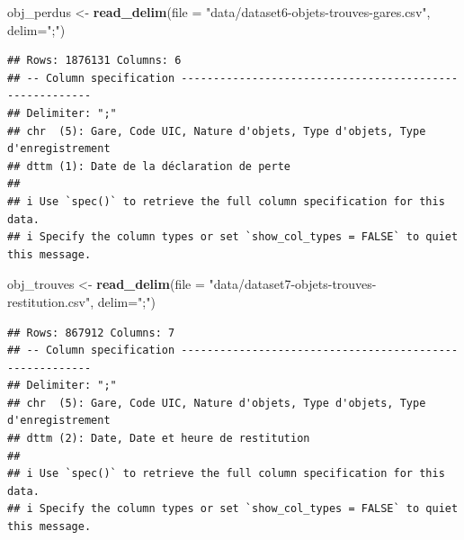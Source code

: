 \documentclass[
]{article}
\newenvironment{Shaded}{\begin{snugshade}}{\end{snugshade}}
\newcommand{\AttributeTok}[1]{\textcolor[rgb]{0.13,0.29,0.53}{#1}}
\newcommand{\FunctionTok}[1]{\textcolor[rgb]{0.13,0.29,0.53}{\textbf{#1}}}
\newcommand{\NormalTok}[1]{#1}
\newcommand{\OtherTok}[1]{\textcolor[rgb]{0.56,0.35,0.01}{#1}}
\newcommand{\StringTok}[1]{\textcolor[rgb]{0.31,0.60,0.02}{#1}}
\begin{document}
\begin{Shaded}
\begin{Highlighting}[]
\NormalTok{obj\_perdus }\OtherTok{\textless{}{-}} \FunctionTok{read\_delim}\NormalTok{(}\AttributeTok{file =} \StringTok{"data/dataset6{-}objets{-}trouves{-}gares.csv"}\NormalTok{, }\AttributeTok{delim=}\StringTok{";"}\NormalTok{)}
\end{Highlighting}
\end{Shaded}

\begin{verbatim}
## Rows: 1876131 Columns: 6
## -- Column specification --------------------------------------------------------
## Delimiter: ";"
## chr  (5): Gare, Code UIC, Nature d'objets, Type d'objets, Type d'enregistrement
## dttm (1): Date de la déclaration de perte
## 
## i Use `spec()` to retrieve the full column specification for this data.
## i Specify the column types or set `show_col_types = FALSE` to quiet this message.
\end{verbatim}

\begin{Shaded}
\begin{Highlighting}[]
\NormalTok{obj\_trouves }\OtherTok{\textless{}{-}} \FunctionTok{read\_delim}\NormalTok{(}\AttributeTok{file =} \StringTok{"data/dataset7{-}objets{-}trouves{-}restitution.csv"}\NormalTok{, }\AttributeTok{delim=}\StringTok{";"}\NormalTok{)}
\end{Highlighting}
\end{Shaded}

\begin{verbatim}
## Rows: 867912 Columns: 7
## -- Column specification --------------------------------------------------------
## Delimiter: ";"
## chr  (5): Gare, Code UIC, Nature d'objets, Type d'objets, Type d'enregistrement
## dttm (2): Date, Date et heure de restitution
## 
## i Use `spec()` to retrieve the full column specification for this data.
## i Specify the column types or set `show_col_types = FALSE` to quiet this message.
\end{verbatim}
\end{document}
